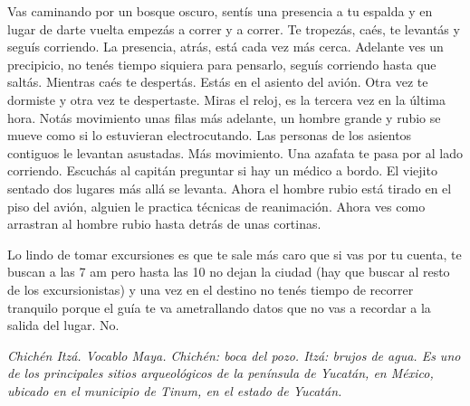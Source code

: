 \documentclass[11pt,twoside,openright,a6paper]{book}
\begin{document}
Vas caminando por un bosque oscuro, sentís una presencia a tu espalda
y en lugar de darte vuelta empezás a correr y a correr. Te tropezás,
caés, te levantás y seguís corriendo. La presencia, atrás, está cada vez
más cerca. Adelante ves un precipicio, no tenés tiempo siquiera
para pensarlo, seguís corriendo hasta que saltás. Mientras caés te
despertás. Estás en el asiento del avión. Otra vez te dormiste y otra vez
te despertaste. Miras el reloj, es la tercera vez en la última hora. Notás
movimiento unas filas más adelante, un hombre grande y rubio se mueve  como
si lo estuvieran electrocutando. Las personas de los asientos contiguos
le levantan asustadas. Más movimiento. Una azafata te pasa por al lado
corriendo. Escuchás al capitán preguntar si hay un médico a bordo. El
viejito sentado dos lugares más allá se levanta. Ahora el hombre rubio
está tirado en el piso del avión, alguien le practica técnicas de
reanimación. Ahora ves como arrastran al hombre rubio hasta detrás de
unas cortinas.


\vspace{0.5cm}
\hrulefill\hspace{0.2cm} \decofourleft\decofourright \hspace{0.2cm} \hrulefill
\vspace{0.5cm}

Lo lindo de tomar excursiones es que te sale más caro que si vas por tu
cuenta, te buscan a las 7 am pero hasta las 10 no dejan la ciudad (hay que
buscar al resto de los excursionistas) y una vez en el destino no tenés
tiempo de recorrer tranquilo porque el guía te va ametrallando datos que
no vas a recordar a la salida del lugar. No.


\vspace{0.5cm}
\hrulefill\hspace{0.2cm} \decofourleft\decofourright \hspace{0.2cm} \hrulefill
\vspace{0.5cm}

\emph{Chichén Itzá. Vocablo Maya. Chichén: boca del pozo. Itzá: brujos de agua.
Es uno de los principales sitios arqueológicos de la península de Yucatán,
en México, ubicado en el municipio de Tinum, en el estado de Yucatán.}


\vspace{0.5cm}
\hrulefill\hspace{0.2cm} \decofourleft\decofourright \hspace{0.2cm} \hrulefill
\vspace{0.5cm}
\end{document}
